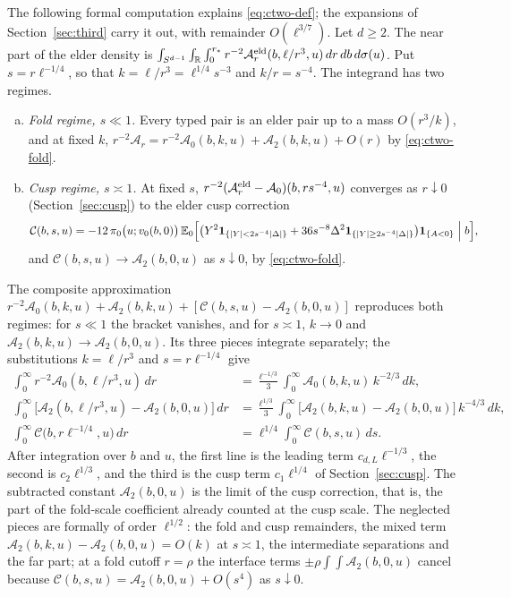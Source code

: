 \begin{remark}\label{rem:ctwo-mechanism}
The following formal computation explains \eqref{eq:ctwo-def}; the expansions of Section~\ref{sec:third} carry it out, with remainder $O(\ell^{3/7})$. Let $d\ge2$. The near part of the elder density is $\int_{S^{d-1}}\int_\mathbb R\int_0^{r_*}r^{-2}\mathcal A^{\mathrm{eld}}_r(b,\ell/r^3,u)\,dr\,db\,d\sigma(u)$. Put $s=r\ell^{-1/4}$, so that $k=\ell/r^3=\ell^{1/4}s^{-3}$ and $k/r=s^{-4}$. The integrand has two regimes.
\begin{enumerate}[(a),leftmargin=2em]
\item \emph{Fold regime, $s\ll1$.} Every typed pair is an elder pair up to a mass $O(r^3/k)$, and at fixed $k$, $r^{-2}\mathcal A_r=r^{-2}\mathcal A_0(b,k,u)+\mathcal A_2(b,k,u)+O(r)$ by \eqref{eq:ctwo-fold}.
\item \emph{Cusp regime, $s\asymp1$.} At fixed $s$, $r^{-2}(\mathcal A^{\mathrm{eld}}_r-\mathcal A_0)(b,rs^{-4},u)$ converges as $r\downarrow0$ (Section~\ref{sec:cusp}) to the elder cusp correction
\[
\mathcal C(b,s,u)=-12\,\pi_0\bigl(u;v_0(b,0)\bigr)\,\mathbb E_0\Bigl[\bigl(Y^2\mathbf 1_{\{|Y|<2s^{-4}|\Delta|\}}+36s^{-8}\Delta^2\mathbf 1_{\{|Y|\ge2s^{-4}|\Delta|\}}\bigr)\mathbf 1_{\{A<0\}}\Bigm|b\Bigr],
\]
and $\mathcal C(b,s,u)\to\mathcal A_2(b,0,u)$ as $s\downarrow0$, by \eqref{eq:ctwo-fold}.
\end{enumerate}
The composite approximation $r^{-2}\mathcal A_0(b,k,u)+\mathcal A_2(b,k,u)+[\mathcal C(b,s,u)-\mathcal A_2(b,0,u)]$ reproduces both regimes: for $s\ll1$ the bracket vanishes, and for $s\asymp1$, $k\to0$ and $\mathcal A_2(b,k,u)\to\mathcal A_2(b,0,u)$. Its three pieces integrate separately; the substitutions $k=\ell/r^3$ and $s=r\ell^{-1/4}$ give
\begin{equation}\label{eq:ctwo-pieces}
\begin{aligned}
\int_0^\infty r^{-2}\mathcal A_0(b,\ell/r^3,u)\,dr&=\frac{\ell^{-1/3}}3\int_0^\infty\mathcal A_0(b,k,u)\,k^{-2/3}\,dk,\\
\int_0^\infty\bigl[\mathcal A_2(b,\ell/r^3,u)-\mathcal A_2(b,0,u)\bigr]\,dr&=\frac{\ell^{1/3}}3\int_0^\infty\bigl[\mathcal A_2(b,k,u)-\mathcal A_2(b,0,u)\bigr]\,k^{-4/3}\,dk,\\
\int_0^\infty\mathcal C\bigl(b,r\ell^{-1/4},u\bigr)\,dr&=\ell^{1/4}\int_0^\infty\mathcal C(b,s,u)\,ds .
\end{aligned}
\end{equation}
After integration over $b$ and $u$, the first line is the leading term $c_{d,L}\ell^{-1/3}$, the second is $c_2\ell^{1/3}$, and the third is the cusp term $c_1\ell^{1/4}$ of Section~\ref{sec:cusp}. The subtracted constant $\mathcal A_2(b,0,u)$ is the limit of the cusp correction, that is, the part of the fold-scale coefficient already counted at the cusp scale. The neglected pieces are formally of order $\ell^{1/2}$: the fold and cusp remainders, the mixed term $\mathcal A_2(b,k,u)-\mathcal A_2(b,0,u)=O(k)$ at $s\asymp1$, the intermediate separations and the far part; at a fold cutoff $r=\rho$ the interface terms $\pm\rho\int\!\!\int\mathcal A_2(b,0,u)$ cancel because $\mathcal C(b,s,u)=\mathcal A_2(b,0,u)+O(s^4)$ as $s\downarrow0$.


\end{remark}
